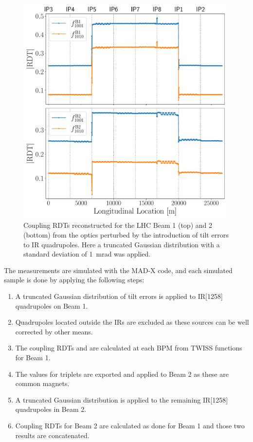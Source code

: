 \begin{figure}[!htb]
    \centering
    \includegraphics*[width=0.99\textwidth]{Figures/ML_for_IR_Coupling/example_coupling_rdts.pdf}
    \caption{Coupling RDTs reconstructed for the LHC Beam 1 (top) and 2 (bottom) from the optics perturbed by the introduction of tilt errors to IR quadrupoles. Here a truncated Gaussian distribution with a standard deviation of \qty{1}{\milli\radian} was applied.}
    \label{fig:example_coupling_rdts}
\end{figure}

The measurements are simulated with the MAD-X code, and each simulated sample is done by applying the following steps:

\begin{enumerate}
    \item A truncated Gaussian distribution of tilt errors \DPSI is applied to IR[1258] quadrupoles on Beam 1.
    \item Quadrupoles located outside the IRs are excluded as these sources can be well corrected by other means.
    \item The coupling RDTs \foneohone and \foneohoneoh are calculated at each BPM from TWISS functions for Beam 1.
    \item The \DPSI values for triplets are exported and applied to Beam 2 as these are common magnets.
    \item A truncated Gaussian distribution is applied to the remaining IR[1258] quadrupoles in Beam 2.
    \item Coupling RDTs for Beam 2 are calculated as done for Beam 1 and those two results are concatenated.
\end{enumerate}

